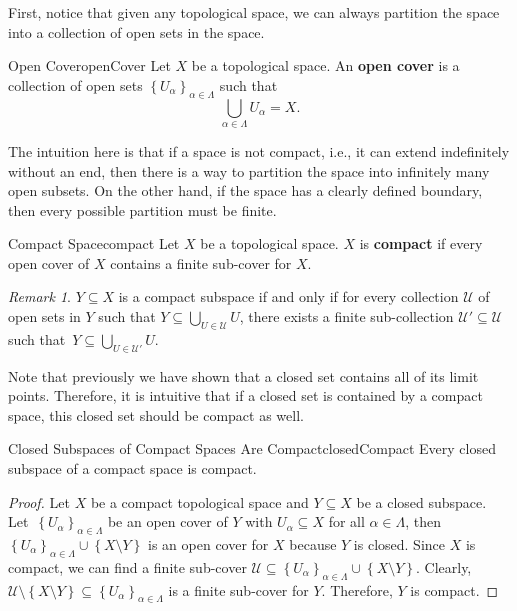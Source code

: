 \documentclass[math]{amznotes}
\theoremstyle{remark}
\newtheorem*{remark}{Remark}
\begin{document}
First, notice that given any topological space, we can always partition the space into a collection of open sets in the space.
\begin{dfnbox}{Open Cover}{openCover}
    Let $X$ be a topological space. An {\color{red} \textbf{open cover}} is a collection of open sets $\left\{U_{\alpha}\right\}_{\alpha \in \Lambda}$ such that 
    \begin{equation*}
        \bigcup_{\alpha \in \Lambda}U_{\alpha} = X.
    \end{equation*}
\end{dfnbox}
The intuition here is that if a space is not compact, i.e., it can extend indefinitely without an end, then there is a way to partition the space into infinitely many open subsets. On the other hand, if the space has a clearly defined boundary, then every possible partition must be finite.
\begin{dfnbox}{Compact Space}{compact}
    Let $X$ be a topological space. $X$ is {\color{red} \textbf{compact}} if every open cover of $X$ contains a finite sub-cover for $X$.
\end{dfnbox}
\begin{notebox}
    \begin{remark}
        $Y \subseteq X$ is a compact subspace if and only if for every collection $\mathcal{U}$ of open sets in $Y$ such that $Y \subseteq \bigcup_{U \in \mathcal{U}}U$, there exists a finite sub-collection $\mathcal{U}' \subseteq \mathcal{U}$ such that~$Y \subseteq \bigcup_{U \in \mathcal{U}'}U$.
    \end{remark}
\end{notebox}
Note that previously we have shown that a closed set contains all of its limit points. Therefore, it is intuitive that if a closed set is contained by a compact space, this closed set should be compact as well.
\begin{probox}{Closed Subspaces of Compact Spaces Are Compact}{closedCompact}
    Every closed subspace of a compact space is compact.
    \tcblower
    \begin{proof}
        Let $X$ be a compact topological space and $Y \subseteq X$ be a closed subspace. Let~$\left\{U_{\alpha}\right\}_{\alpha \in \Lambda}$ be an open cover of $Y$ with $U_{\alpha} \subseteq X$ for all $\alpha \in \Lambda$, then $\left\{U_{\alpha}\right\}_{\alpha \in \Lambda} \cup \left\{X \setminus Y\right\}$ is an open cover for $X$ because $Y$ is closed. Since $X$ is compact, we can find a finite sub-cover $\mathcal{U} \subseteq \left\{U_{\alpha}\right\}_{\alpha \in \Lambda} \cup \left\{X \setminus Y\right\}$. Clearly, $\mathcal{U} \setminus \left\{X \setminus Y\right\} \subseteq \left\{U_{\alpha}\right\}_{\alpha \in \Lambda}$ is a finite sub-cover for $Y$. Therefore, $Y$ is compact. 
    \end{proof}
\end{probox}
\end{document}
